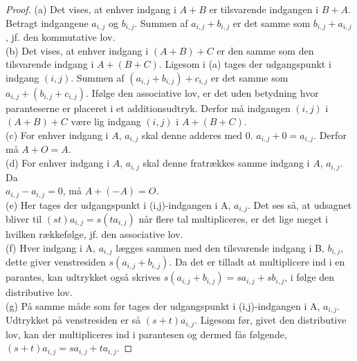 \begin{proof} 
(a) Det vises, at enhver indgang i $A + B$ er tilsvarende indgangen i $B + A$. Betragt indgangene $a_{i,j}$ og $b_{i,j}$. Summen af $a_{i,j} + b_{i,j}$ er det samme som $b_{i,j} + a_{i,j}$, jf. den kommutative lov. \\
(b) Det vises, at enhver indgang i $(A + B) + C$ er den samme som den tilsvarende indgang i $A + (B + C)$. Ligesom i (a) tages der udgangspunkt i indgang $(i,j)$. Summen af $(a_{i,j} + b_{i,j}) + c_{i,j}$ er det samme som $a_{i,j} + (b_{i,j} + c_{i,j})$. Ifølge den associative lov, er det uden betydning hvor paranteserne er placeret i et additionsudtryk. Derfor må indgangen $(i,j)$ i $(A + B) + C$ være lig indgang $(i,j)$ i $A + (B + C)$. \\
(c) For enhver indgang i $A$, $a_{i,j}$ skal denne adderes med $0$. $a_{i,j}+0=a_{i,j}$. Derfor må $A + O = A$. \\
(d) For enhver indgang i $A$, $a_{i,j}$ skal denne fratrækkes samme indgang i $A$, $a_{i,j}$. Da \\ $a_{i,j} - a_{i,j} = 0$, må $A + (-A) = O$. \\
(e) Her tages der udgangspunkt i (i,j)-indgangen i A, $a_{i,j}$. Det ses så, at udsagnet bliver til $(st)a_{i,j} = s(ta_{i,j})$ når flere tal multipliceres, er det lige meget i hvilken rækkefølge, jf. den associative lov. \\
(f) Hver indgang i A, $a_{i,j}$ lægges sammen med den tilsvarende indgang i B, $b_{i,j}$, dette giver venstresiden $s(a_{i,j}+b_{i,j})$. Da det er tilladt at multiplicere ind i en parantes, kan udtrykket også skrives $s(a_{i,j}+b_{i,j})=sa_{i,j}+sb_{i,j}$, i følge den distributive lov. \\
(g) På samme måde som før tages der udgangspunkt i (i,j)-indgangen i A, $a_{i,j}$. Udtrykket på venstresiden er så $(s+t)a_{i,j}$. Ligesom før, givet den distributive lov, kan der multipliceres ind i parantesen og dermed fås følgende, $(s+t)a_{i,j}=sa_{i,j}+ta_{i,j}$.
\end{proof}

